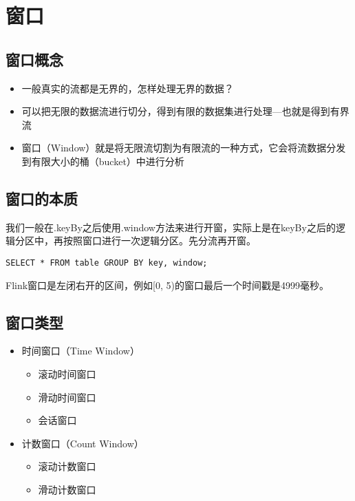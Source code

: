 \documentclass[cn,11pt,chinese]{elegantbook}
\begin{document}
\chapter{窗口}

\section{窗口概念}

\begin{itemize}
  \item 一般真实的流都是无界的，怎样处理无界的数据？
  \item 可以把无限的数据流进行切分，得到有限的数据集进行处理—也就是得到有界流
  \item 窗口（Window）就是将无限流切割为有限流的一种方式，它会将流数据分发到有限大小的桶（bucket）中进行分析
\end{itemize}

\section{窗口的本质}

我们一般在.keyBy之后使用.window方法来进行开窗，实际上是在keyBy之后的逻辑分区中，再按照窗口进行一次逻辑分区。先分流再开窗。

\begin{lstlisting}
SELECT * FROM table GROUP BY key, window;
\end{lstlisting}

Flink窗口是左闭右开的区间，例如[0, 5)的窗口最后一个时间戳是4999毫秒。

\section{窗口类型}

\begin{itemize}
  \item 时间窗口（Time Window）
    \begin{itemize}
      \item 滚动时间窗口
      \item 滑动时间窗口
      \item 会话窗口
    \end{itemize}
  \item 计数窗口（Count Window）
    \begin{itemize}
      \item 滚动计数窗口
      \item 滑动计数窗口
    \end{itemize}
\end{itemize}
\end{document}
